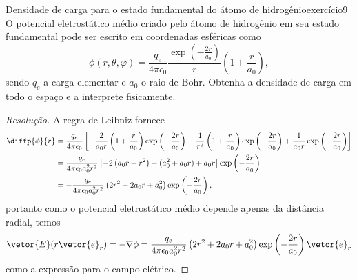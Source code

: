 \begin{exercício}{Densidade de carga para o estado fundamental do átomo de hidrogênio}{exercício9}
    O potencial eletrostático médio criado pelo átomo de hidrogênio em seu estado fundamental pode ser escrito em coordenadas esféricas como
    \begin{equation*}
        \phi(r, \theta, \varphi) = \frac{q_e}{4\pi \epsilon_0} \frac{\exp\left(-\frac{2r}{a_0}\right)}{r} \left(1 + \frac{r}{a_0}\right),
    \end{equation*}
    sendo \(q_e\) a carga elementar e \(a_0\) o raio de Bohr. Obtenha a densidade de carga em todo o espaço e a interprete fisicamente.
\end{exercício}
\begin{proof}[Resolução]
    A regra de Leibniz fornece
    \begin{align*}
        \diffp{\phi}{r} &= \frac{q_e}{4\pi \epsilon_0} \left[-\frac{2}{a_0r}\left(1 + \frac{r}{a_0}\right)\exp\left(-\frac{2r}{a_0}\right) - \frac{1}{r^2}\left(1 + \frac{r}{a_0}\right)\exp\left(-\frac{2r}{a_0}\right) + \frac{1}{a_0 r}\exp\left(-\frac{2r}{a_0}\right)\right]\\
                        &= \frac{q_e}{4\pi \epsilon_0 a_0^2 r^2}\left[-2\left(a_0r + r^2\right)-(a_0^2 + a_0r)+ a_0r\right]\exp\left(-\frac{2r}{a_0}\right)\\
                        &= -\frac{q_e}{4\pi \epsilon_0 a_0^2 r^2}\left(2r^2 + 2a_0 r + a_0^2\right)\exp\left(-\frac{2r}{a_0}\right),
    \end{align*}
    portanto como o potencial eletrostático médio depende apenas da distância radial, temos
    \begin{equation*}
        \vetor{E}(r \vetor{e}_r) = -\nabla\phi = \frac{q_e}{4\pi \epsilon_0 a_0^2r^2}\left(2r^2 + 2a_0 r + a_0^2\right)\exp\left(-\frac{2r}{a_0}\right)\vetor{e}_r
    \end{equation*}
    como a expressão para o campo elétrico.


\end{proof}
